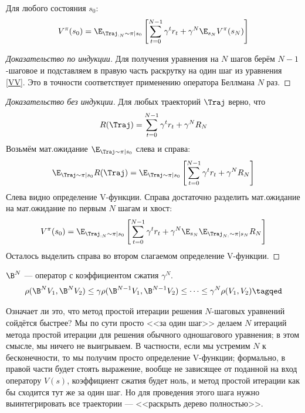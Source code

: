 \begin{theorem}Для любого состояния $s_0$:
\begin{equation}\label{NstepBellman}
 V^{\pi}(s_0) = \E_{\Traj_{:N} \sim \pi \mid s_0} \left[ \sum_{t=0}^{N-1} \gamma^{t}r_t +  \gamma^N \E_{s_N} V^{\pi}(s_N) \right]   
\end{equation}
\begin{proof}[Доказательство по индукции]
Для получения уравнения на $N$ шагов берём $N-1$-шаговое и подставляем в правую часть раскрутку на один шаг из уравнения \eqref{VV}. Это в точности соответствует применению оператора Беллмана $N$ раз.
\end{proof}
\begin{proof}[Доказательство без индукции]
Для любых траекторий $\Traj$ верно, что
$$R(\Traj) = \sum_{t=0}^{N-1} \gamma^{t}r_t + \gamma^N R_N$$
Возьмём мат.ожидание $\E_{\Traj \sim \pi \mid s_0}$ слева и справа:
$$\E_{\Traj \sim \pi \mid s_0}R(\Traj) = \E_{\Traj \sim \pi \mid s_0} \left[ \sum_{t=0}^{N-1} \gamma^{t}r_t + \gamma^N R_N \right]$$
Слева видно определение V-функции. Справа достаточно разделить мат.ожидание на мат.ожидание по первым $N$ шагам и хвост:
$$V^{\pi}(s_0) = \E_{\Traj_{:N} \sim \pi \mid s_0} \left[ \sum_{t=0}^{N-1} \gamma^{t}r_t + \gamma^N \E_{s_N} \E_{\Traj_{N:} \sim \pi \mid s_N} R_N \right]$$
Осталось выделить справа во втором слагаемом определение V-функции.
\end{proof}
\end{theorem}

\begin{proposition}
$\B^N$ --- оператор с коэффициентом сжатия $\gamma^N$.
\beginproof
\begin{align*}
\rho(\B^N V_1, \B^N V_2) \le \gamma \rho (\B^{N-1} V_1, \B^{N-1} V_2) \le \dots \le \gamma^N \rho (V_1, V_2)   \tagqed
\end{align*}
\end{proposition}

Означает ли это, что метод простой итерации решения $N$-шаговых уравнений сойдётся быстрее? Мы по сути просто <<за один шаг>> делаем $N$ итераций метода простой итерации для решения обычного одношагового уравнения; в этом смысле, мы ничего не выигрываем. В частности, если мы устремим $N$ к бесконечности, то мы получим просто определение V-функции; формально, в правой части будет стоять выражение, вообще не зависящее от поданной на вход оператору $V(s)$, коэффициент сжатия будет ноль, и метод простой итерации как бы сходится тут же за один шаг. Но для проведения этого шага нужно выинтегрировать все траектории --- <<раскрыть дерево полностью>>.

